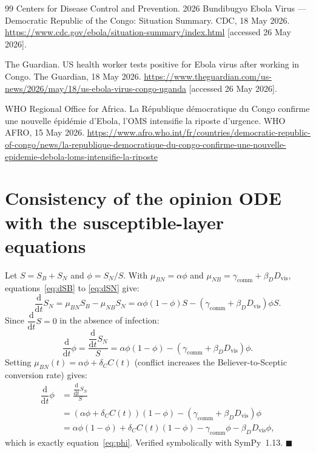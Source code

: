 \documentclass[12pt,a4paper]{article}
\newcommand{\ddt}{\dfrac{\mathrm{d}}{\mathrm{d}t}}
\newcommand{\SB}{S_{\!B}}\newcommand{\EB}{E_{\!B}}
\newcommand{\SN}{S_{\!N}}\newcommand{\EN}{E_{\!N}}
\begin{document}
\begin{thebibliography}{99}
Centers for Disease Control and Prevention.
2026 Bundibugyo Ebola Virus --- Democratic Republic of the Congo:
Situation Summary.
CDC, 18 May 2026.
\url{https://www.cdc.gov/ebola/situation-summary/index.html}
[accessed 26 May 2026].

The Guardian.
US health worker tests positive for Ebola virus after working in Congo.
The Guardian, 18 May 2026.
\url{https://www.theguardian.com/us-news/2026/may/18/us-ebola-virus-congo-uganda}
[accessed 26 May 2026].

WHO Regional Office for Africa.
La R\'epublique d\'emocratique du Congo confirme une nouvelle \'epid\'emie
d'Ebola, l'OMS intensifie la riposte d'urgence.
WHO AFRO, 15 May 2026.
\url{https://www.afro.who.int/fr/countries/democratic-republic-of-congo/news/la-republique-democratique-du-congo-confirme-une-nouvelle-epidemie-debola-loms-intensifie-la-riposte}

\end{thebibliography}

\clearpage
\appendix
\setcounter{section}{0}
\renewcommand{\thesection}{Supplementary~\Alph{section}}
\renewcommand{\thefigure}{S\arabic{figure}}
\setcounter{figure}{0}

\section{Consistency of the opinion ODE with the susceptible-layer equations}
\label{supp:A}

Let $S = \SB + \SN$ and $\phi = \SN/S$. With
$\mu_{BN} = \alpha\phi$ and $\mu_{NB} = \gamma_{\text{comm}} +
\beta_D D_{\text{vis}}$, equations~\eqref{eq:dSB} to \eqref{eq:dSN} give:
\[
  \ddt\SN = \mu_{BN}\SB - \mu_{NB}\SN
          = \alpha\phi(1-\phi)S - (\gamma_{\text{comm}}+\beta_D D_{\text{vis}})\phi S.
\]
Since $\ddt S = 0$ in the absence of infection:
\[
  \ddt\phi = \frac{\ddt\SN}{S}
           = \alpha\phi(1-\phi) - (\gamma_{\text{comm}} + \beta_D D_{\text{vis}})\phi.
\]
Setting $\mu_{BN}(t)=\alpha\phi+\delta_C C(t)$ (conflict increases
the Believer-to-Sceptic conversion rate) gives:
\begin{align*}
  \ddt\phi &= \frac{\ddt S_N}{S} \\
  &= (\alpha\phi + \delta_C C(t))(1-\phi)
     - (\gamma_{\text{comm}} + \beta_D D_{\text{vis}})\phi \\
  &= \alpha\phi(1-\phi) + \delta_C C(t)(1-\phi)
     - \gamma_{\text{comm}}\phi - \beta_D D_{\text{vis}}\phi,
\end{align*}
which is exactly equation~\eqref{eq:phi}. Verified symbolically with
SymPy~1.13. $\blacksquare$
\end{document}
